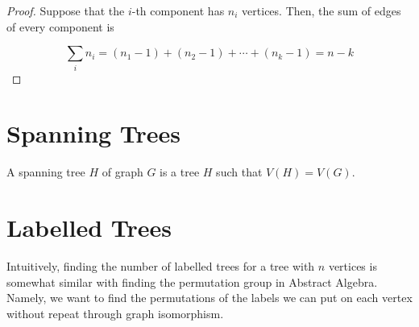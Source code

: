 \begin{proof}
  Suppose that the \(i\)-th component has \(n_i\) vertices. Then, the sum of
  edges of every component is 

  \begin{displaymath}
    \sum_{i} n_i = (n_1 - 1) + (n_2 - 1) + \cdots + (n_k - 1) = n-k
  \end{displaymath}
\end{proof}

\section{Spanning Trees}

\begin{definition}
  A spanning tree \(H\) of graph \(G\) is a tree \(H\) such that \(V(H) =
  V(G)\).
\end{definition}

\section{Labelled Trees}

Intuitively, finding the number of labelled trees for a tree with \(n\) vertices
is somewhat similar with finding the permutation group in Abstract Algebra.
Namely, we want to find the permutations of the labels we can put on each vertex
without repeat through graph isomorphism.

